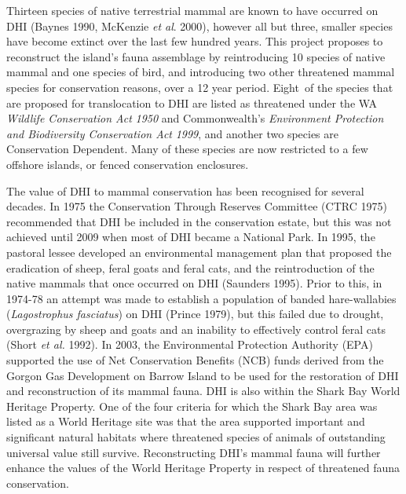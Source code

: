 \documentclass[version=last,
    paper=a4,                               %
    10pt,                                   %
    dvipsnames,
    oneside,                              %
    headings=openany,                       %
    open=any,
    BCOR=7mm,                               %
    DIV=15,     %
]{scrbook}
\begin{document}
Thirteen species of native terrestrial mammal are known to have occurred
on DHI (Baynes 1990, McKenzie \emph{et al}. 2000), however all but
three, smaller species have become extinct over the last few hundred
years. This project proposes to reconstruct the island's fauna
assemblage by reintroducing 10 species of native mammal and one species
of bird, and introducing two other threatened mammal species for
conservation reasons, over a 12 year period. Eight~of the species that
are proposed for translocation to DHI are listed as threatened under the
WA \emph{Wildlife Conservation Act} \emph{1950} and Commonwealth's
\emph{Environment Protection and Biodiversity Conservation Act}
\emph{1999}, and another two species are Conservation Dependent. Many of
these species are now restricted to a few offshore islands, or fenced
conservation enclosures.

The value of DHI to mammal conservation has been recognised for several
decades. In 1975 the Conservation Through Reserves Committee (CTRC 1975)
recommended that DHI be included in the conservation estate, but this
was not achieved until 2009 when most of DHI became a National Park. In
1995, the pastoral lessee developed an environmental management plan
that proposed the eradication of sheep, feral goats and feral cats, and
the reintroduction of the native mammals that once occurred on DHI
(Saunders 1995). Prior to this, in 1974-78 an attempt was made to
establish a population of banded hare-wallabies (\emph{Lagostrophus
fasciatus}) on DHI (Prince 1979), but this failed due to drought,
overgrazing by sheep and goats and an inability to effectively control
feral cats (Short \emph{et al.} 1992). In 2003, the Environmental
Protection Authority (EPA) supported the use of Net Conservation
Benefits (NCB) funds derived from the Gorgon Gas Development on Barrow
Island to be used for the restoration of DHI and reconstruction of its
mammal fauna. DHI is also within the Shark Bay World Heritage Property.
One of the four criteria for which the Shark Bay area was listed as a
World Heritage site was that the area supported important and
significant natural habitats where threatened species of animals of
outstanding universal value still survive. Reconstructing DHI's mammal
fauna will further enhance the values of the World Heritage Property in
respect of threatened fauna conservation.
\end{document}
